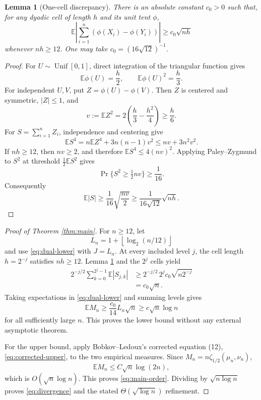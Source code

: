 \documentclass[11pt]{article}
\newtheorem{lemma}[theorem]{Lemma}
\newcommand{\E}{\mathbb E}
\newcommand{\Unif}{\operatorname{Unif}}
\begin{document}
\begin{lemma}[One-cell discrepancy]\label{lem:cell}
There is an absolute constant \(c_0>0\) such that, for any dyadic cell of
length \(h\) and its unit tent \(\phi\),
\[
 \E\left|\sum_{i=1}^n(\phi(X_i)-\phi(Y_i))\right|
 \ge c_0\sqrt{nh}
\]
whenever \(nh\ge12\).  One may take \(c_0=(16\sqrt{12})^{-1}\).
\end{lemma}

\begin{proof}
For \(U\sim\Unif[0,1]\), direct integration of the triangular function gives
\[
 \E\phi(U)=\frac h2,
 \qquad
 \E\phi(U)^2=\frac h3.
\]
For independent \(U,V\), put \(Z=\phi(U)-\phi(V)\).  Then \(Z\) is centered
and symmetric, \(|Z|\le1\), and
\[
 v:=\E Z^2=2\left(\frac h3-\frac{h^2}{4}\right)
 \ge\frac h6.
\]
For \(S=\sum_{i=1}^n Z_i\), independence and centering give
\[
 \E S^4=n\E Z^4+3n(n-1)v^2
 \le nv+3n^2v^2.
\]
If \(nh\ge12\), then \(nv\ge2\), and therefore
\(\E S^4\le4(nv)^2\).  Applying Paley--Zygmund to \(S^2\) at threshold
\(\tfrac12\E S^2\) gives
\[
 \Pr\{S^2\ge\tfrac12nv\}\ge\frac1{16}.
\]
Consequently
\[
 \E|S|\ge\frac1{16}\sqrt{\frac{nv}{2}}
 \ge\frac1{16\sqrt{12}}\sqrt{nh}.
\]
\end{proof}

\begin{proof}[Proof of Theorem \ref{thm:main}]
For \(n\ge12\), let
\[
 L_n=1+\left\lfloor\log_2(n/12)\right\rfloor
\]
and use \eqref{eq:dual-lower} with \(J=L_n\).  At every included level
\(j\), the cell length \(h=2^{-j}\) satisfies \(nh\ge12\).  Lemma
\ref{lem:cell} and the \(2^j\) cells yield
\begin{align*}
 2^{-j/2}\sum_{k=0}^{2^j-1}\E|S_{j,k}|
 &\ge 2^{-j/2}\,2^j c_0\sqrt{n2^{-j}}\\
 &=c_0\sqrt n.
\end{align*}
Taking expectations in \eqref{eq:dual-lower} and summing levels gives
\[
 \E M_n\ge\frac{c_0}{14}L_n\sqrt n
 \ge c\sqrt n\log n
\]
for all sufficiently large \(n\).  This proves the lower bound without any
external asymptotic theorem.

For the upper bound, apply Bobkov--Ledoux's corrected equation (12),
\eqref{eq:corrected-upper}, to the two empirical measures.  Since
\(M_n=n\zeta_{1/2}(\mu_n,\nu_n)\),
\[
 \E M_n\le C\sqrt n\log(2n),
\]
which is \(O(\sqrt n\log n)\).  This proves \eqref{eq:main-order}.  Dividing
by \(\sqrt{n\log n}\) proves \eqref{eq:divergence} and the stated
\(\Theta(\sqrt{\log n})\) refinement.
\end{proof}
\end{document}
